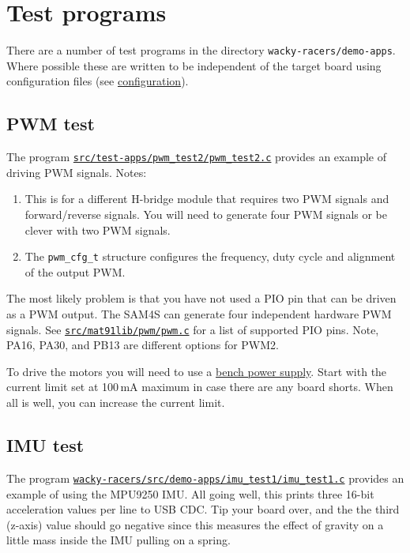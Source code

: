 \section{Test programs}
\label{test-programs}

There are a number of test programs in the directory
\texttt{wacky-racers/demo-apps}. Where possible these are written to be
independent of the target board using configuration files (see
\protect\hyperref[configuration]{configuration}).

\subsection{PWM test}
\label{pwm-test}

The program
\href{https://eng-git.canterbury.ac.nz/mph/wacky-racers-2021/blob/master/src/test-apps/pwm_test2/pwm_test2.c}{\texttt{src/test-apps/pwm\_test2/pwm\_test2.c}}
provides an example of driving PWM signals. Notes:
%
\begin{enumerate}
\item
  This is for a different H-bridge module that requires two PWM signals
  and forward/reverse signals. You will need to generate four PWM
  signals or be clever with two PWM signals.
\item
  The \texttt{pwm\_cfg\_t} structure configures the frequency, duty
  cycle and alignment of the output PWM.
\end{enumerate}

The most likely problem is that you have not used a PIO pin that can be
driven as a PWM output. The SAM4S can generate four independent hardware
PWM signals. See
\href{https://eng-git.canterbury.ac.nz/mph/wacky-racers-2021/blob/master/src/mat91lib/pwm/pwm.c}{\texttt{src/mat91lib/pwm/pwm.c}}
for a list of supported PIO pins. Note, PA16, PA30, and PB13 are
different options for PWM2.

To drive the motors you will need to use a
\href{bench_power_supply}{bench power supply}. Start with the current
limit set at 100\,mA maximum in case there are any board shorts.
When all is well, you can increase the current limit.

\subsection{IMU test}
\label{imu-test}

The program
\href{https://eng-git.canterbury.ac.nz/mph/wacky-racers-2021/blob/master/src/demo-apps/imu_test1/imu_test1.c}{\texttt{wacky-racers/src/demo-apps/imu\_test1/imu\_test1.c}}
provides an example of using the MPU9250 IMU. All going well, this
prints three 16-bit acceleration values per line to USB CDC. Tip your
board over, and the the third (z-axis) value should go negative since
this measures the effect of gravity on a little mass inside the IMU
pulling on a spring.


